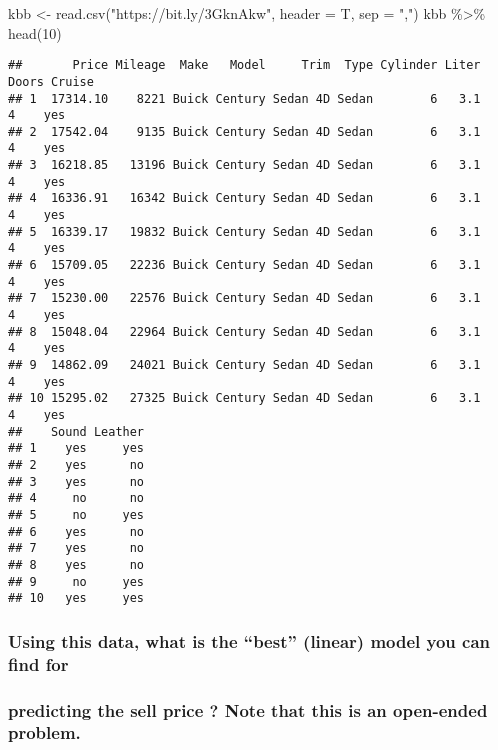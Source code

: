 \documentclass[
]{article}
\newenvironment{Shaded}{\begin{snugshade}}{\end{snugshade}}
\newcommand{\AttributeTok}[1]{\textcolor[rgb]{0.77,0.63,0.00}{#1}}
\newcommand{\DecValTok}[1]{\textcolor[rgb]{0.00,0.00,0.81}{#1}}
\newcommand{\FunctionTok}[1]{\textcolor[rgb]{0.00,0.00,0.00}{#1}}
\newcommand{\NormalTok}[1]{#1}
\newcommand{\OtherTok}[1]{\textcolor[rgb]{0.56,0.35,0.01}{#1}}
\newcommand{\SpecialCharTok}[1]{\textcolor[rgb]{0.00,0.00,0.00}{#1}}
\newcommand{\StringTok}[1]{\textcolor[rgb]{0.31,0.60,0.02}{#1}}
\begin{document}
\begin{Shaded}
\begin{Highlighting}[]
\NormalTok{kbb }\OtherTok{\textless{}{-}} \FunctionTok{read.csv}\NormalTok{(}\StringTok{"https://bit.ly/3GknAkw"}\NormalTok{, }\AttributeTok{header =}\NormalTok{ T, }\AttributeTok{sep =} \StringTok{","}\NormalTok{)}
\NormalTok{kbb }\SpecialCharTok{\%\textgreater{}\%} \FunctionTok{head}\NormalTok{(}\DecValTok{10}\NormalTok{)}
\end{Highlighting}
\end{Shaded}

\begin{verbatim}
##       Price Mileage  Make   Model     Trim  Type Cylinder Liter Doors Cruise
## 1  17314.10    8221 Buick Century Sedan 4D Sedan        6   3.1     4    yes
## 2  17542.04    9135 Buick Century Sedan 4D Sedan        6   3.1     4    yes
## 3  16218.85   13196 Buick Century Sedan 4D Sedan        6   3.1     4    yes
## 4  16336.91   16342 Buick Century Sedan 4D Sedan        6   3.1     4    yes
## 5  16339.17   19832 Buick Century Sedan 4D Sedan        6   3.1     4    yes
## 6  15709.05   22236 Buick Century Sedan 4D Sedan        6   3.1     4    yes
## 7  15230.00   22576 Buick Century Sedan 4D Sedan        6   3.1     4    yes
## 8  15048.04   22964 Buick Century Sedan 4D Sedan        6   3.1     4    yes
## 9  14862.09   24021 Buick Century Sedan 4D Sedan        6   3.1     4    yes
## 10 15295.02   27325 Buick Century Sedan 4D Sedan        6   3.1     4    yes
##    Sound Leather
## 1    yes     yes
## 2    yes      no
## 3    yes      no
## 4     no      no
## 5     no     yes
## 6    yes      no
## 7    yes      no
## 8    yes      no
## 9     no     yes
## 10   yes     yes
\end{verbatim}

\hypertarget{using-this-data-what-is-the-best-linear-model-you-can-find-for}{%
\subsubsection{Using this data, what is the ``best'' (linear) model you
can find
for}\label{using-this-data-what-is-the-best-linear-model-you-can-find-for}}

\hypertarget{predicting-the-sell-price-note-that-this-is-an-open-ended-problem.}{%
\subsubsection{predicting the sell price ? Note that this is an
open-ended
problem.}\label{predicting-the-sell-price-note-that-this-is-an-open-ended-problem.}}
\end{document}
